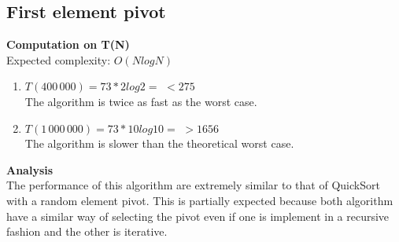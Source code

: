 \documentclass{article}
\begin{document}
\newpage
\subsection{First element pivot}

\begin{center}
\end{center}

\textbf{Computation on T(N)}\\

Expected complexity: $O(NlogN)$\\

\begin{enumerate}
    \item $T(400\,000) = 73 *2 log 2 =$
    $< 275$\\
    The algorithm is twice as fast as the worst case.
    
    \item $T(1\,000\,000) = 73 *10 log 10 =$
    $> 1656$\\
    The algorithm is slower than the theoretical worst case.
    
\end{enumerate}

\textbf{Analysis}\\

The performance of this algorithm are extremely similar to that of QuickSort with a random element pivot. This is partially expected because both algorithm have a similar way of selecting the pivot even if one is implement in a recursive fashion and the other is iterative.
\end{document}
